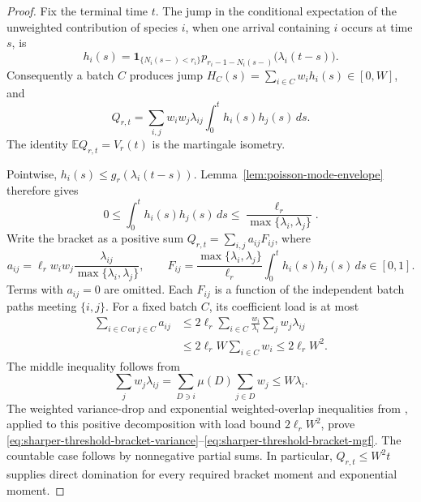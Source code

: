 \documentclass[11pt]{article}
\numberwithin{equation}{section}
\theoremstyle{remark}
\begin{document}
\begin{proof}
Fix the terminal time $t$. The jump in the conditional expectation of
the unweighted contribution of species $i$, when one arrival containing
$i$ occurs at time $s$, is
\[
 h_i(s)=\boldsymbol 1_{\{N_i(s-)<r_i\}}
 p_{r_i-1-N_i(s-)}\bigl(\lambda_i(t-s)\bigr).
\]
Consequently a batch $C$ produces jump
$H_C(s)=\sum_{i\in C}w_i h_i(s)\in[0,W]$, and
\begin{equation}\label{eq:sharper-threshold-bracket-expansion}
 Q_{r,t}=\sum_{i,j}w_iw_j\lambda_{ij}
       \int_0^t h_i(s)h_j(s)\,ds.
\end{equation}
The identity $\mathbb EQ_{r,t}=V_r(t)$ is the martingale isometry.

Pointwise, $h_i(s)\le g_r(\lambda_i(t-s))$.
Lemma~\ref{lem:poisson-mode-envelope} therefore gives
\[
 0\le\int_0^t h_i(s)h_j(s)\,ds
 \le\frac{\ell_r}{\max\{\lambda_i,\lambda_j\}}.
\]
Write the bracket as a positive sum $Q_{r,t}=\sum_{i,j}a_{ij}F_{ij}$,
where
\[
 a_{ij}=\ell_r w_iw_j\frac{\lambda_{ij}}
                            {\max\{\lambda_i,\lambda_j\}},\qquad
 F_{ij}=\frac{\max\{\lambda_i,\lambda_j\}}{\ell_r}
              \int_0^t h_i(s)h_j(s)\,ds\in[0,1].
\]
Terms with $a_{ij}=0$ are omitted. Each $F_{ij}$ is a function of the
independent batch paths meeting $\{i,j\}$. For a fixed batch $C$, its
coefficient load is at most
\begin{align*}
 \sum_{i\in C\ \mathrm{or}\ j\in C}a_{ij}
 &\le2\ell_r\sum_{i\in C}\frac{w_i}{\lambda_i}
                         \sum_jw_j\lambda_{ij}\\
 &\le2\ell_r W\sum_{i\in C}w_i
 \le2\ell_rW^2.
\end{align*}
The middle inequality follows from
\[
 \sum_jw_j\lambda_{ij}
 =\sum_{D\ni i}\mu(D)\sum_{j\in D}w_j\le W\lambda_i.
\]
The weighted variance-drop and exponential weighted-overlap inequalities
from \cite{LongFoundation}, applied to this positive decomposition with
load bound $2\ell_rW^2$, prove
\eqref{eq:sharper-threshold-bracket-variance}--\eqref{eq:sharper-threshold-bracket-mgf}.
The countable case follows by nonnegative partial sums. In particular,
$Q_{r,t}\le W^2t$ supplies direct domination for every required bracket
moment and exponential moment.
\end{proof}
\end{document}
